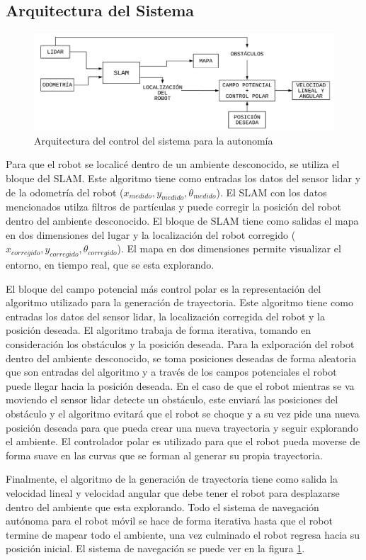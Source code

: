 \subsection{Arquitectura del Sistema}

\begin{figure}%
	\centering \footnotesize
	\includegraphics[width=1.0\textwidth]{images/estruct_auto.png}
	\captionsetup{font=footnotesize}
	\caption{Arquitectura del control del sistema para la autonomía}
	\label{fig:ArqSist}
\end{figure}
 
Para que el robot se localicé dentro de un ambiente desconocido, se utiliza el bloque del SLAM. 
Este algoritmo tiene como entradas los datos del sensor lidar y de la odometría del robot 
($x_{medido},y_{medido},\theta_{medido}$). El SLAM con los datos mencionados utilza filtros de 
partículas y puede corregir la posición del robot dentro del ambiente desconocido. El 
bloque de SLAM tiene como salidas el mapa en dos dimensiones del lugar y la localización del robot 
corregido ($x_{corregido},y_{corregido},\theta_{corregido}$). El mapa en dos dimensiones permite
visualizar el entorno, en tiempo real, que se esta explorando.

El bloque del campo potencial más control polar es la representación del algoritmo utilizado
para la generación de trayectoria. Este algoritmo tiene como entradas los datos del sensor 
lidar, la localización corregida del robot y la posición deseada. El algoritmo trabaja de forma 
iterativa, tomando en consideración los obstáculos y la posición deseada. Para la exlporación del 
robot dentro del ambiente desconocido, se toma posiciones deseadas de forma aleatoria que son
entradas del algoritmo y a través de los campos potenciales el robot puede llegar hacia la posición 
deseada. En el caso de que el robot mientras se va moviendo el sensor lidar detecte un obstáculo, 
este enviará las posiciones del obstáculo y el algoritmo evitará que el robot se choque y a su vez
pide una nueva posición deseada para que pueda crear una nueva trayectoria y seguir explorando el 
ambiente. El controlador polar es utilizado para que el robot pueda moverse de forma suave en las 
curvas que se forman al generar su propia trayectoria.

Finalmente, el algoritmo de la generación de trayectoria tiene como salida la velocidad lineal y 
velocidad angular que debe tener el robot para desplazarse dentro del ambiente que esta explorando. Todo 
el sistema de navegación autónoma para el robot móvil se hace de forma iterativa hasta que el robot 
termine de mapear todo el ambiente, una vez culminado el robot regresa hacia su posición inicial. El 
sistema de navegación se puede ver en la figura \ref{fig:ArqSist}.






